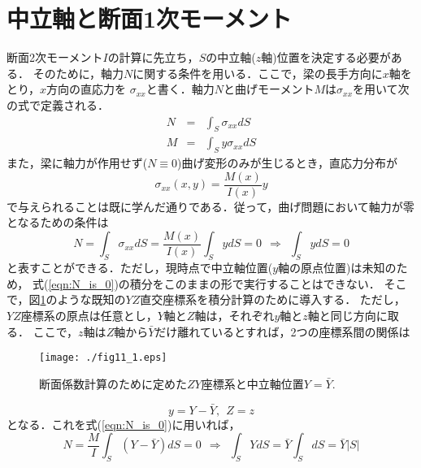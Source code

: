 ﻿\documentclass[10pt,a4j]{jbook}
\begin{document}
\section{中立軸と断面1次モーメント}
断面2次モーメント$I$の計算に先立ち，$S$の中立軸($z$軸)位置を決定する必要がある．
そのために，軸力$N$に関する条件を用いる．ここで，梁の長手方向に$x$軸をとり，$x$方向の直応力を
$\sigma_{xx}$と書く．軸力$N$と曲げモーメント$M$は$\sigma_{xx}$を用いて次の式で定義される．
\begin{eqnarray}
	N &= & \int_S \sigma_{xx}dS 
	\label{eqn:def_N}
	\\
	M &= & \int_S y\sigma_{xx}dS 
	\label{eqn:def_M}
\end{eqnarray}
また，梁に軸力が作用せず($N\equiv 0$)曲げ変形のみが生じるとき，直応力分布が
\begin{equation}
	\sigma_{xx}(x,y)=\frac{M(x)}{I(x)}y
	\label{eqn:sig_xx}
\end{equation}
で与えられることは既に学んだ通りである．従って，曲げ問題において軸力が零となるための条件は
\begin{equation}
	N =  \int_S \sigma_{xx}dS = \frac{M(x)}{I(x)} \int_S ydS = 0 \ \ 
	\Rightarrow \ \ 
	\int_S y dS=0
	\label{eqn:N_is_0}
\end{equation}
と表すことができる．ただし，現時点で中立軸位置($y$軸の原点位置)は未知のため，
式(\ref{eqn:N_is_0})の積分をこのままの形で実行することはできない．
そこで，図\ref{fig:fig11_1}のような既知の$YZ$直交座標系を積分計算のために導入する．
ただし，$YZ$座標系の原点は任意とし，$Y$軸と$Z$軸は，それぞれ$y$軸と$z$軸と同じ方向に取る．
ここで，$z$軸は$Z$軸から$\bar{Y}$だけ離れているとすれば，2つの座標系間の関係は
\begin{figure}[h]
	\begin{center}
	\texttt{[image: ./fig11\_1.eps]} 
	\end{center}
	\caption{
		断面係数計算のために定めた$ZY$座標系と中立軸位置$Y=\bar Y$.
	} 
	\label{fig:fig11_1}
\end{figure}
\begin{equation}
	y=Y-\bar Y, \ \ Z=z
	\label{eqn:y_shift}
\end{equation}
となる．これを式(\ref{eqn:N_is_0})に用いれば，
\begin{equation}
	N=\frac{M}{I}\int_S \left(Y-\bar Y \right)dS=0 
	\ \ \Rightarrow \ \
	\int_S Y dS =
	\bar Y \int_S dS
	=
	\bar Y \left| S \right|
	\label{eqn:as_Nis0}
\end{equation}
\end{document}
